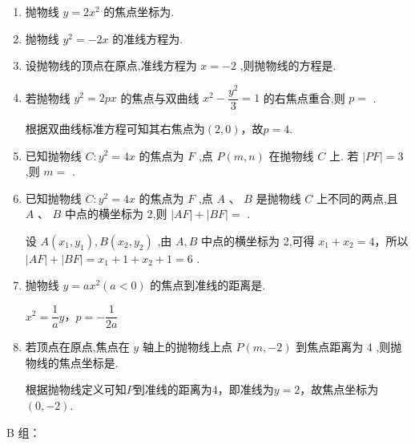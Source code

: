 \begin{enumerate}
    \item 抛物线 $y = 2{x}^{2}$ 的焦点坐标为.
    \item  抛物线 ${y}^{2} =  - {2x}$ 的准线方程为.
    \item 设抛物线的顶点在原点,准线方程为 $x =  - 2$ ,则抛物线的方程是.
    \item 若抛物线 ${y}^{2} = {2px}$ 的焦点与双曲线 ${x}^{2} - \dfrac{{y}^{2}}{3} = 1$ 的右焦点重合,则 $p =$ .
    \begin{jieda}
        根据双曲线标准方程可知其右焦点为$(2, 0)$，故$p = 4$.
    \end{jieda}
    \item 已知抛物线 $C : {y}^{2} = {4x}$ 的焦点为 $F$ ,点 $P\left( {m,n}\right)$ 在抛物线 $C$ 上. 若 $\left| {PF}\right|  = 3$ ,则 $m =$ .
    \item 已知抛物线 $C : {y}^{2} = {4x}$ 的焦点为 $F$ ,点 $A\text{ 、 }B$ 是抛物线 $C$ 上不同的两点,且$A\text{ 、 }B$ 中点的横坐标为 2,则 $\left| {AF}\right|  + \left| {BF}\right|  =$ .
    \begin{jieda}
        设 $A\left( {{x}_{1},{y}_{1}}\right) ,B\left( {{x}_{2},{y}_{2}}\right)$ ,由 $A,B$ 中点的横坐标为 2,可得 ${x}_{1} + {x}_{2} = 4$，所以 $\left| {AF}\right|  + \left| {BF}\right|  = {x}_{1} + 1 + {x}_{2} + 1 = 6$ .
    \end{jieda}
    \item 抛物线 $y = a{x}^{2}\left( {a < 0}\right)$ 的焦点到准线的距离是.
    \begin{jieda}
        $x^2=\dfrac{1}{a}y$，$p = -\dfrac{1}{2a}$
    \end{jieda}
    \item 若顶点在原点,焦点在 $y$ 轴上的抛物线上点 $P\left( {m, - 2}\right)$ 到焦点距离为 4 ,则抛物线的焦点坐标是.
    \begin{jieda}
        根据抛物线定义可知$P$到准线的距离为$4$，即准线为$y = 2$，故焦点坐标为$(0, -2)$.
    \end{jieda}

\end{enumerate}
B 组：
